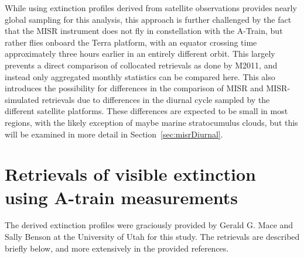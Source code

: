 While using extinction profiles derived from satellite observations
provides nearly global sampling for this analysis, this approach is
further challenged by the fact that the MISR instrument does not fly in
constellation with the A-Train, but rather flies onboard the Terra
platform, with an equator crossing time approximately three hours
earlier in an entirely different orbit. This largely prevents a direct
comparison of collocated retrievals as done by M2011, and instead only
aggregated monthly statistics can be compared here. This also introduces
the possibility for differences in the comparison of MISR and
MISR-simulated retrievals due to differences in the diurnal cycle
sampled by the different satellite platforms. These differences are
expected to be small in most regions, with the likely exception of maybe
marine stratocumulus clouds, but this will be examined in more detail in
Section~\ref{sec:misrDiurnal}.

\section{Retrievals of visible extinction using A-train
measurements}\label{sec:ccRetrievals}

The derived extinction profiles were graciously provided by Gerald G.
Mace and Sally Benson at the University of Utah for this study. The
retrievals are described briefly below, and more extensively in the
provided references.

